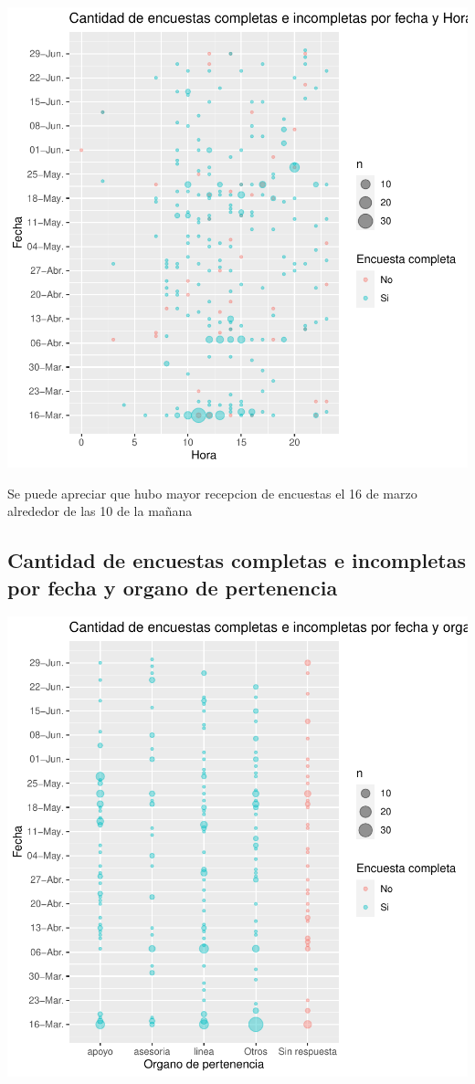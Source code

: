 \documentclass{article}
\begin{document}
\includegraphics{seguimientov3-065}

Se puede apreciar que hubo mayor recepcion de encuestas el 16 de marzo alrededor de las 10 de la mañana

\subsection{Cantidad de encuestas completas e incompletas por fecha y organo de pertenencia}

\includegraphics{seguimientov3-066}
\end{document}
